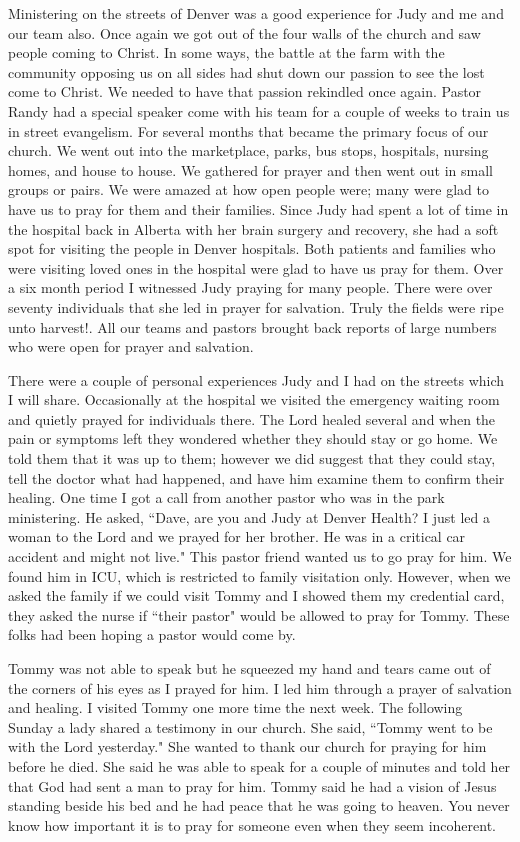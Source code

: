 \documentclass[oneside]{book}
\begin{document}
Ministering on the streets of Denver was a good experience for Judy and me and our team also. Once again we got out of the four walls of the church and saw people coming to Christ. In some ways, the battle at the farm with the community opposing us on all sides had shut down our passion to see the lost come to Christ. We needed to have that passion rekindled once again. Pastor Randy had a special speaker come with his team for a couple of weeks to train us in street evangelism. For several months that became the primary focus of our church. We went out into the marketplace, parks, bus stops, hospitals, nursing homes, and house to house. We gathered for prayer and then went out in small groups or pairs. We were amazed at how open people were; many were glad to have us to pray for them and their families. Since Judy had spent a lot of time in the hospital back in Alberta with her brain surgery and recovery, she had a soft spot for visiting the people in Denver hospitals. Both patients and families who were visiting loved ones in the hospital were glad to have us pray for them. Over a six month period I witnessed Judy praying for many people. There were over seventy individuals that she led in prayer for salvation. Truly the fields were ripe unto harvest!. All our teams and pastors brought back reports of large numbers who were open for prayer and salvation. 


There were a couple of personal experiences Judy and I had on the streets which I will share. Occasionally at the hospital we visited the emergency waiting room and quietly prayed for individuals there. The Lord healed several and when the pain or symptoms left they wondered whether they should stay or go home. We told them that it was up to them; however we did  suggest that they could stay, tell the doctor what had happened, and have him examine them to confirm their healing. One time I got a call from another pastor who was in the park ministering. He asked, ``Dave, are you and Judy at Denver Health? I just led a woman to the Lord and we prayed for her brother. He was in a critical car accident and might not live." This pastor friend wanted us to go pray for him. We found him in ICU, which is restricted to family visitation only. However, when we asked the family if we could visit Tommy and I showed them my credential card, they asked the nurse if ``their pastor" would be allowed to pray for Tommy. These folks had been hoping a pastor would come by. 

Tommy was not able to speak but he squeezed my hand and tears came out of the corners of his eyes as I prayed for him. I led him through a prayer of salvation and healing. I visited Tommy one more time the next week. The following Sunday a lady shared a testimony in our church. She said, ``Tommy went to be with the Lord yesterday." She wanted to thank our church for praying for him before he died. She said he was able to speak for a couple of minutes and told her that God had sent a man to pray for him. Tommy said he had a vision of Jesus standing beside his bed and he had peace that he was going to heaven. You never know how important it is to pray for someone even when they seem incoherent. 
\end{document}
